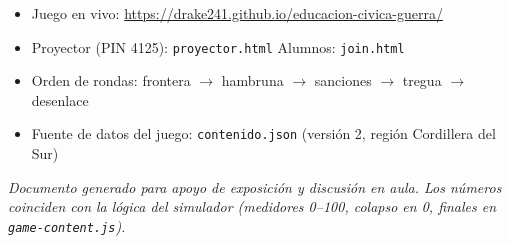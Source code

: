 \documentclass[11pt,a4paper]{article}
\begin{document}
\begin{itemize}
  \item Juego en vivo: \url{https://drake241.github.io/educacion-civica-guerra/}
  \item Proyector (PIN 4125): \texttt{proyector.html} \quad Alumnos: \texttt{join.html}
  \item Orden de rondas: frontera $\rightarrow$ hambruna $\rightarrow$ sanciones $\rightarrow$ tregua $\rightarrow$ desenlace
  \item Fuente de datos del juego: \texttt{contenido.json} (versión 2, región Cordillera del Sur)
\end{itemize}

\vspace{1em}
\begin{center}
\small\textit{Documento generado para apoyo de exposición y discusión en aula. Los números coinciden con la lógica del simulador (medidores 0--100, colapso en 0, finales en \texttt{game-content.js}).}
\end{center}
\end{document}
